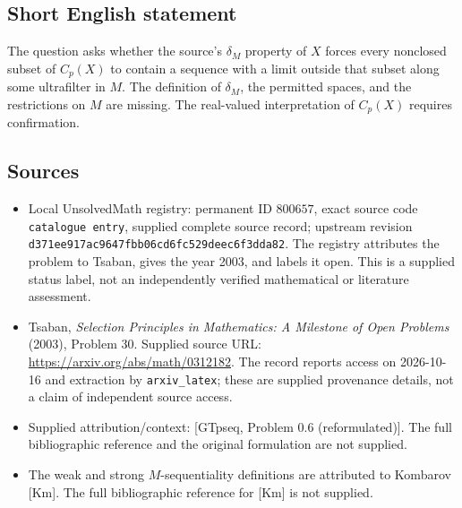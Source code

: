 \documentclass[11pt]{article}
\begin{document}
\subsection{Short English statement}
The question asks whether the source's \(\delta_M\) property of \(X\) forces every nonclosed subset of \(C_p(X)\) to contain a sequence with a limit outside that subset along some ultrafilter in \(M\). The definition of \(\delta_M\), the permitted spaces, and the restrictions on \(M\) are missing. The real-valued interpretation of \(C_p(X)\) requires confirmation.
\subsection{Sources}
\begin{itemize}
\item Local UnsolvedMath registry: permanent ID \(800657\), exact source code \texttt{catalogue entry}, supplied complete source record; upstream revision \texttt{d371ee917ac9647fbb06cd6fc529deec6f3dda82}. The registry attributes the problem to Tsaban, gives the year 2003, and labels it open. This is a supplied status label, not an independently verified mathematical or literature assessment.
\item Tsaban, \emph{Selection Principles in Mathematics: A Milestone of Open Problems} (2003), Problem 30. Supplied source URL: \url{https://arxiv.org/abs/math/0312182}. The record reports access on 2026-10-16 and extraction by \texttt{arxiv\_latex}; these are supplied provenance details, not a claim of independent source access.
\item Supplied attribution/context: [GTpseq, Problem 0.6 (reformulated)]. The full bibliographic reference and the original formulation are not supplied.
\item The weak and strong \(M\)-sequentiality definitions are attributed to Kombarov [Km]. The full bibliographic reference for [Km] is not supplied.
\end{itemize}
\end{document}
